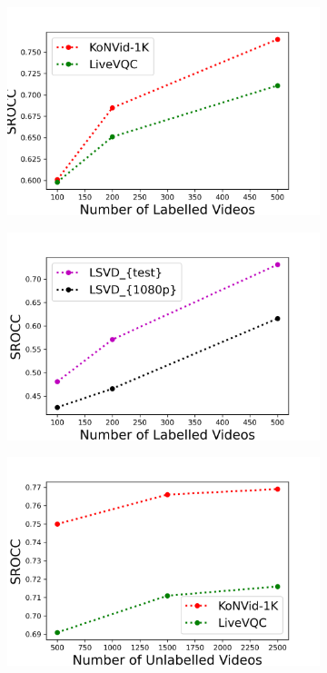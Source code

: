 \documentclass[10pt,twocolumn,letterpaper]{article}
\begin{document}
\begin{figure}[ht]
   \centering
   \begin{subfigure}[b]{0.48\columnwidth}
     \centering
     \includegraphics[width=\textwidth,keepaspectratio]{figures/label_KV.png}
     \caption{}
     \label{fig:labelled_kv}
   \end{subfigure}
   \hfill
   \begin{subfigure}[b]{0.48\columnwidth}
     \centering
     \includegraphics[width=\columnwidth,keepaspectratio]{figures/label_lsvd.png}
     \caption{}
     \label{fig:labelled_lsvd}
   \end{subfigure}
   \hfill
      \begin{subfigure}[b]{0.48\columnwidth}
     \centering
     \includegraphics[width=\columnwidth,keepaspectratio]{figures/unlabel_KV.png}

\end{subfigure}
\end{figure}
\end{document}
